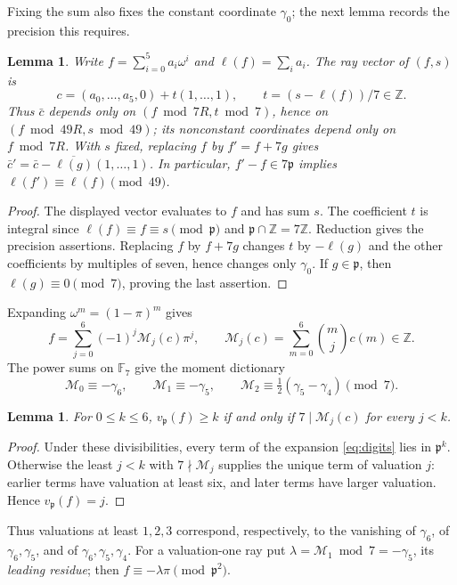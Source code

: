 \documentclass[11pt]{amsart}
\theoremstyle{plain}
\newtheorem{lemma}[theorem]{Lemma}
\theoremstyle{definition}
\numberwithin{equation}{section}
\newcommand{\Z}{\mathbb Z}
\newcommand{\F}{\mathbb F}
\newcommand{\pp}{\mathfrak p}
\begin{document}
Fixing the sum also fixes the constant coordinate $\gamma_0$;
the next lemma records the precision this requires.
\begin{lemma}\label{lem:cbar-window}
Write $f=\sum_{i=0}^5a_i\omega^i$ and $\ell(f)=\sum_i a_i$.
The ray vector of $(f,s)$ is
\[
 c=(a_0,\ldots,a_5,0)+t(1,\ldots,1),\qquad
 t=(s-\ell(f))/7\in\Z.
\]
Thus $\bar c$ depends only on $(f\bmod7R,t\bmod7)$, hence on
$(f\bmod49R,s\bmod49)$; its nonconstant coordinates depend only on
$f\bmod7R$. With $s$ fixed, replacing $f$ by $f'=f+7g$ gives
$\bar c'=\bar c-\overline{\ell(g)}(1,\ldots,1)$. In particular,
$f'-f\in7\pp$ implies $\ell(f')\equiv\ell(f)\pmod{49}$.
\end{lemma}
\begin{proof}
The displayed vector evaluates to $f$ and has sum $s$.
The coefficient $t$ is integral since
$\ell(f)\equiv f\equiv s\pmod\pp$ and $\pp\cap\Z=7\Z$.
Reduction gives the precision assertions. Replacing $f$ by $f+7g$
changes $t$ by $-\ell(g)$ and the other coefficients by multiples
of seven, hence changes only $\gamma_0$. If $g\in\pp$, then
$\ell(g)\equiv0\pmod7$, proving the last assertion.
\end{proof}

Expanding $\omega^m=(1-\pi)^m$ gives
\begin{equation}\label{eq:digits}
 f=\sum_{j=0}^6(-1)^j\mathcal M_j(c)\pi^j,\qquad
 \mathcal M_j(c)=\sum_{m=0}^6\binom mj c(m)\in\Z.
\end{equation}
The power sums on $\F_7$ give the moment dictionary
\begin{equation}\label{eq:moment-dict}
 \mathcal M_0\equiv-\gamma_6,\qquad
 \mathcal M_1\equiv-\gamma_5,\qquad
 \mathcal M_2\equiv\tfrac12(\gamma_5-\gamma_4)\pmod7.
\end{equation}

\begin{lemma}\label{lem:digits}
For $0\le k\le6$, $v_\pp(f)\ge k$ if and only if
$7\mid\mathcal M_j(c)$ for every $j<k$.
\end{lemma}
\begin{proof}
Under these divisibilities, every term of the expansion
\eqref{eq:digits} lies in $\pp^k$.
Otherwise the least $j<k$ with $7\nmid\mathcal M_j$ supplies
the unique term of valuation $j$: earlier terms have valuation at
least six, and later terms have larger valuation. Hence $v_\pp(f)=j$.
\end{proof}
Thus valuations at least $1,2,3$ correspond, respectively, to the
vanishing of $\gamma_6$, of $\gamma_6,\gamma_5$, and of
$\gamma_6,\gamma_5,\gamma_4$. For a valuation-one ray put
$\lambda=\mathcal M_1\bmod7=-\gamma_5$, its \emph{leading residue};
then $f\equiv-\lambda\pi\pmod{\pp^2}$.
\end{document}
